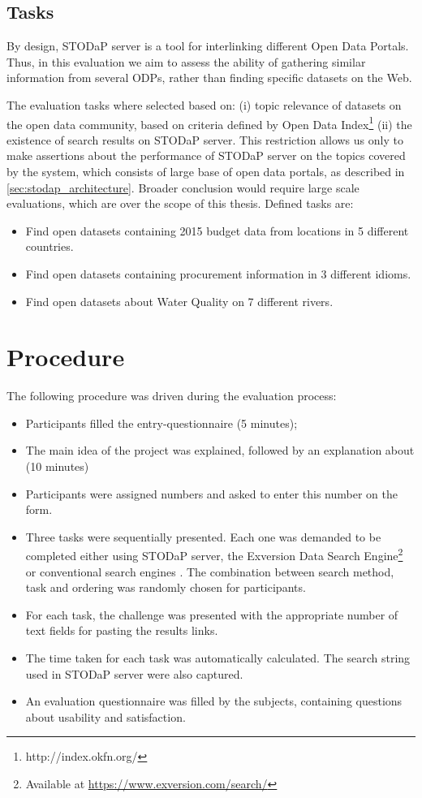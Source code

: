 \subsection{Tasks}

By design, STODaP server is a tool for interlinking different Open Data Portals.
Thus, in this evaluation we aim to assess the ability of gathering similar information from several ODPs, rather than finding specific datasets on the Web.

The evaluation tasks where selected based on: (i) topic relevance of datasets on the open data community, based on criteria defined by Open Data Index\footnote{http://index.okfn.org/} (ii) the existence of search results on STODaP server.
This restriction allows us only to make assertions about the performance of STODaP server on the topics covered by the system, which consists of large base of open data portals, as described in \autoref{sec:stodap_architecture}.
Broader conclusion would require large scale evaluations, which are over the scope of this thesis.
Defined tasks are:

\begin{itemize}
	\item Find open datasets containing 2015 budget data from locations in 5 different countries.
	\item Find open datasets containing procurement information in 3 different idioms.
	\item Find open datasets about Water Quality on 7 different rivers.
\end{itemize}

\section{Procedure}

The following procedure was driven during the evaluation process:

\begin{itemize}
	\item Participants filled the entry-questionnaire (5 minutes);
	\item The main idea of the project was explained, followed by an explanation about (10 minutes)
	\item Participants were assigned numbers and asked to enter this number on the form. 
	\item Three tasks were sequentially presented. 
	Each one was demanded to be completed either using STODaP server, the Exversion Data Search Engine\footnote{Available at \url{https://www.exversion.com/search/}} or conventional search engines \cite{Xu2009}.
	The combination between search method, task and ordering was randomly chosen for participants.
	\item For each task, the challenge was presented with the appropriate number of text fields for pasting the results links.
	\item The time taken for each task was automatically calculated. The search string used in STODaP server were also captured.
	\item An evaluation questionnaire was filled by the subjects, containing questions about usability and satisfaction.
\end{itemize}

